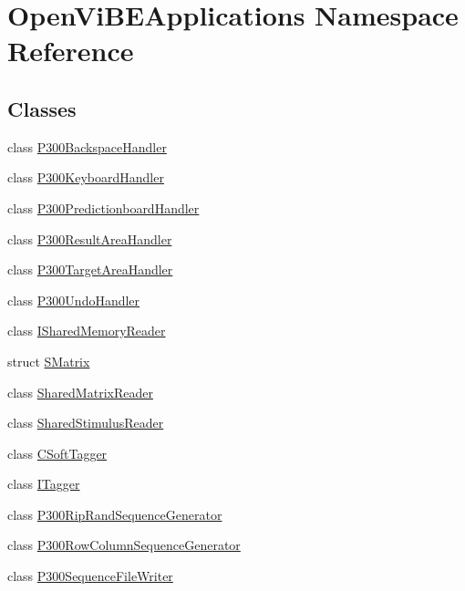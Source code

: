\hypertarget{namespaceOpenViBEApplications}{
\section{OpenViBEApplications Namespace Reference}
\label{namespaceOpenViBEApplications}
}
\subsection*{Classes}
\begin{DoxyCompactItemize}
\item 
class \hyperlink{classOpenViBEApplications_1_1P300BackspaceHandler}{P300BackspaceHandler}
\item 
class \hyperlink{classOpenViBEApplications_1_1P300KeyboardHandler}{P300KeyboardHandler}
\item 
class \hyperlink{classOpenViBEApplications_1_1P300PredictionboardHandler}{P300PredictionboardHandler}
\item 
class \hyperlink{classOpenViBEApplications_1_1P300ResultAreaHandler}{P300ResultAreaHandler}
\item 
class \hyperlink{classOpenViBEApplications_1_1P300TargetAreaHandler}{P300TargetAreaHandler}
\item 
class \hyperlink{classOpenViBEApplications_1_1P300UndoHandler}{P300UndoHandler}
\item 
class \hyperlink{classOpenViBEApplications_1_1ISharedMemoryReader}{ISharedMemoryReader}
\item 
struct \hyperlink{structOpenViBEApplications_1_1SMatrix}{SMatrix}
\item 
class \hyperlink{classOpenViBEApplications_1_1SharedMatrixReader}{SharedMatrixReader}
\item 
class \hyperlink{classOpenViBEApplications_1_1SharedStimulusReader}{SharedStimulusReader}
\item 
class \hyperlink{classOpenViBEApplications_1_1CSoftTagger}{CSoftTagger}
\item 
class \hyperlink{classOpenViBEApplications_1_1ITagger}{ITagger}
\item 
class \hyperlink{classOpenViBEApplications_1_1P300RipRandSequenceGenerator}{P300RipRandSequenceGenerator}
\item 
class \hyperlink{classOpenViBEApplications_1_1P300RowColumnSequenceGenerator}{P300RowColumnSequenceGenerator}
\item 
class \hyperlink{classOpenViBEApplications_1_1P300SequenceFileWriter}{P300SequenceFileWriter}

\end{DoxyCompactItemize}
